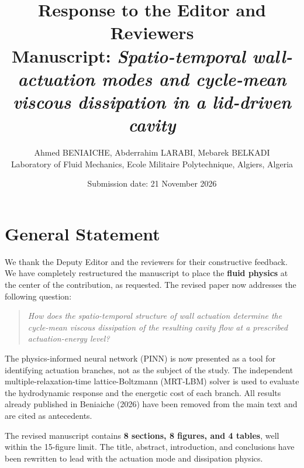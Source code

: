 \documentclass[11pt,a4paper]{article}
\title{\bfseries Response to the Editor and Reviewers\\[6pt]
Manuscript: \textit{Spatio-temporal wall-actuation modes and cycle-mean\\
viscous dissipation in a lid-driven cavity}}
\author{Ahmed BENIAICHE, Abderrahim LARABI, Mebarek BELKADI\\
Laboratory of Fluid Mechanics, Ecole Militaire Polytechnique, Algiers, Algeria}
\date{Submission date: 21 November 2026}
\begin{document}
\maketitle

\begin{center}
\end{center}
\medskip

\tableofcontents
\newpage

\section*{General Statement}

We thank the Deputy Editor and the reviewers for their constructive feedback.
We have completely restructured the manuscript to place the \textbf{fluid
physics} at the center of the contribution, as requested. The revised paper
now addresses the following question:

\begin{quote}
\textit{How does the spatio-temporal structure of wall actuation determine the
cycle-mean viscous dissipation of the resulting cavity flow at a prescribed
actuation-energy level?}
\end{quote}

The physics-informed neural network (PINN) is now presented as a tool for
identifying actuation branches, not as the subject of the study. The
independent multiple-relaxation-time lattice-Boltzmann (MRT-LBM) solver is
used to evaluate the hydrodynamic response and the energetic cost of each
branch. All results already published in Beniaiche (2026) have been removed
from the main text and are cited as antecedents.

The revised manuscript contains \textbf{8 sections, 8 figures, and 4 tables},
well within the 15-figure limit. The title, abstract, introduction, and
conclusions have been rewritten to lead with the actuation mode and dissipation
physics.
\end{document}
